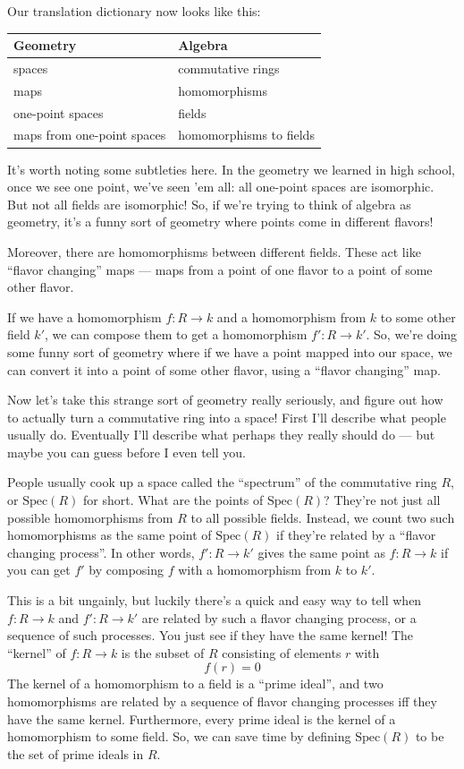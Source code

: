 \documentclass{article}
\begin{document}
Our translation dictionary now looks like this:

\begin{longtable}[]{@{}ll@{}}
\toprule
Geometry & Algebra\tabularnewline
\midrule
\endhead
spaces & commutative rings\tabularnewline
maps & homomorphisms\tabularnewline
one-point spaces & fields\tabularnewline
maps from one-point spaces & homomorphisms to fields\tabularnewline
\bottomrule
\end{longtable}

It's worth noting some subtleties here. In the geometry we learned in
high school, once we see one point, we've seen 'em all: all one-point
spaces are isomorphic. But not all fields are isomorphic! So, if we're
trying to think of algebra as geometry, it's a funny sort of geometry
where points come in different flavors!

Moreover, there are homomorphisms between different fields. These act
like ``flavor changing'' maps --- maps from a point of one flavor to a
point of some other flavor.

If we have a homomorphism \(f\colon R \to k\) and a homomorphism from
\(k\) to some other field \(k'\), we can compose them to get a
homomorphism \(f'\colon R \to k'\). So, we're doing some funny sort of
geometry where if we have a point mapped into our space, we can convert
it into a point of some other flavor, using a ``flavor changing'' map.

Now let's take this strange sort of geometry really seriously, and
figure out how to actually turn a commutative ring into a space! First
I'll describe what people usually do. Eventually I'll describe what
perhaps they really should do --- but maybe you can guess before I even
tell you.

People usually cook up a space called the ``spectrum'' of the
commutative ring \(R\), or \(\mathrm{Spec}(R)\) for short. What are the
points of \(\mathrm{Spec}(R)\)? They're not just all possible
homomorphisms from \(R\) to all possible fields. Instead, we count two
such homomorphisms as the same point of \(\mathrm{Spec}(R)\) if they're
related by a ``flavor changing process''. In other words,
\(f'\colon R \to k'\) gives the same point as \(f\colon R \to k\) if you
can get \(f'\) by composing \(f\) with a homomorphism from \(k\) to
\(k'\).

This is a bit ungainly, but luckily there's a quick and easy way to tell
when \(f\colon R \to k\) and \(f'\colon R \to k'\) are related by such a
flavor changing process, or a sequence of such processes. You just see
if they have the same kernel! The ``kernel'' of \(f\colon R \to k\) is
the subset of \(R\) consisting of elements \(r\) with \[f(r) = 0\] The
kernel of a homomorphism to a field is a ``prime ideal'', and two
homomorphisms are related by a sequence of flavor changing processes iff
they have the same kernel. Furthermore, every prime ideal is the kernel
of a homomorphism to some field. So, we can save time by defining
\(\mathrm{Spec}(R)\) to be the set of prime ideals in \(R\).
\end{document}
